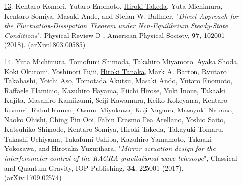 \documentclass[uplatex, 12pt]{article}
\begin{document}
\begin{enumerate}
\item[\uline{13}.] Kentaro Komori, Yutaro Enomoto, \uline{Hiroki Takeda}, Yuta Michimura, Kentaro Somiya, Masaki Ando, and Stefan W. Ballmer, "\emph{Direct Approach for the Fluctuation-Dissipation Theorem under Non-Equilibrium Steady-State Conditions}", Physical Review D , American Physical Society, {\bf 97}, 102001 (2018). (arXiv:1803.00585)\\

\item[\uline{14}.] Yuta Michimura, Tomofumi Shimoda, Takahiro Miyamoto, Ayaka Shoda, Koki Okutomi, Yoshinori Fujii, \uline{Hiroki Tanaka}, Mark A. Barton, Ryutaro Takahashi, Yoichi Aso, Tomotada Akutsu, Masaki Ando, Yutaro Enomoto, Raffaele Flaminio, Kazuhiro Hayama, Eiichi Hirose, Yuki Inoue, Takaaki Kajita, Masahiro Kamiizumi, Seiji Kawamura, Keiko Kokeyama, Kentaro Komori, Rahul Kumar, Osamu Miyakawa, Koji Nagano, Masayuki Nakano, Naoko Ohishi, Ching Pin Ooi, Fabin Erasmo Pea Arellano, Yoshio Saito, Katsuhiko Shimode, Kentaro Somiya, Hiroki Takeda, Takayuki Tomaru, Takashi Uchiyama, Takafumi Ushiba, Kazuhiro Yamamoto, Takaaki Yokozawa, and Hirotaka Yuzurihara, "\emph{Mirror actuation design for the interferometer control of the KAGRA gravitational wave telescope}", Classical and Quantum Gravity, IOP Publishing, {\bf 34}, 225001 (2017). (arXiv:1709.02574)
\end{enumerate}
\end{document}
